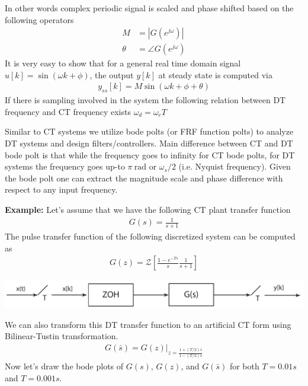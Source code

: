 \documentclass[twoside]{article}
\begin{document}
%
In other words complex periodic signal is scaled and phase shifted
based on the following operators
%
\begin{align*}
M &= | G(e^{j \omega}) | \\
\theta &= \angle G(e^{j \omega})
\end{align*}
%
It is very easy to show that for a general real time domain signal
$u[k] = \sin (\omega k + \phi)$, the output $y[k]$ at steady state 
is computed via
%
\begin{align*}
  y_{ss}[k] = M \sin(\omega k + \phi + \theta)
\end{align*}
%
If there is sampling involved in the system the following relation
between DT frequency and CT frequency exists $\omega_d = \omega_c T$

Similar to CT systems we utilize bode polts (or FRF function polts) to
analyze DT systems and design filters/controllers. Main difference
between CT and DT bode polt is that while the frequency goes to
infinity for CT bode polts, for DT systems the frequency goes up-to
$\pi \ \mathrm{rad}$ or  $\omega_s / 2$ (i.e. Nyquist frequency). 
Given the bode polt one can extract the magnitude scale and phase 
difference with respect to any input frequency. 

\textbf{Example:} Let's assume that we have the following 
CT plant transfer function
%
\begin{align*}
  G(s) = \frac{1}{s+1}
\end{align*}
%
The pulse transfer function of the following discretized 
system can be computed as
%
%
\begin{align*}
  G(z) = \mathcal{Z} \left[ \frac{1-e^{-Ts}}{s} \frac{1}{s+1} \right] 
\end{align*}
%
     \begin{center}
 \begin{minipage}[h]{\linewidth}
     \begin{center}
       \includegraphics[width=\textwidth]{Gz}
     \end{center}
 \end{minipage}
     \end{center}
%
We can also transform this DT transfer function to an 
artificial CT form using Bilinear-Tustin transformation.
%
%
\begin{align*}
  G(\bar{s}) = G(z) |_{z = \frac{1 + (T/2) \bar{s}}{1 - (T/2) \bar{s}}} 
\end{align*}
%
Now let's draw the bode plots of $G(s)$, $G(z)$, and $G(\bar{s})$
for both $T = 0.01 s$ and $T = 0.001 s$.
\end{document}
